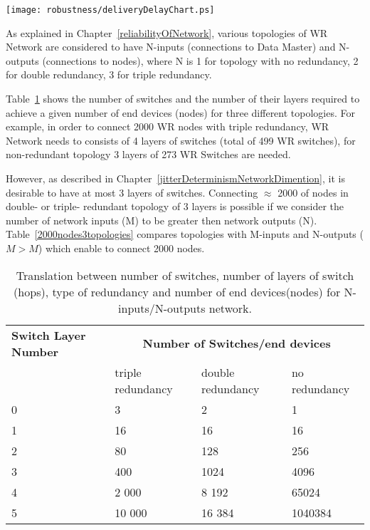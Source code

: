 \begin{center}
	\texttt{[image: robustness/deliveryDelayChart.ps]}
	\label{fig:deliveryDelayChart}
\end{center}

As explained in Chapter~\ref{reliabilityOfNetwork}, various topologies of WR
Network are considered to have N-inputs (connections to Data Master) and
N-outputs (connections to nodes), where N is 1 for topology with no redundancy,
2 for double redundancy, 3 for triple redundancy. 

Table~\ref{tab:translation3topologies} shows the number of switches and the
number of their layers required to achieve a given number of end devices (nodes)
for three different topologies.
For example, in order to connect 2000 WR nodes with triple redundancy, WR
Network needs to consists of 4 layers of switches (total of 499 WR switches),
for non-redundant topology 3 layers of 273 WR Switches are needed. 

However, as described in Chapter~\ref{jitterDeterminismNetworkDimention}, it is
desirable to have at most 3 layers of switches. Connecting $\approx$ 2000 of
nodes in double- or triple- redundant topology of 3 layers is possible if we
consider the number of network inputs (M) to be greater then network outputs
(N). Table~\ref{2000nodes3topologies} compares topologies with M-inputs and
N-outputs ($M>M$) which enable to connect 2000 nodes.

\begin{table}[ht]
\caption{Translation between number of switches, number of layers of switch 
(hops), type of redundancy and number of end devices(nodes) for
N-inputs/N-outputs network.} 
\centering 
\begin{tabular}{| p{1.9cm} | p{2.7cm} | p{2.7cm} | p{2.5cm} |}       
\hline
\textbf{Switch Layer Number}& \multicolumn{3}{|c|}{\textbf{Number of
Switches/end devices}}  \\
      & triple redundancy & double redundancy & no redundancy   \\ \hline
0     & 3                 & 2                 & 1                  \\ \hline
1     & 16                & 16                & 16                \\ \hline
2     & 80                & 128               & 256               \\ \hline
3     & 400               & 1024              & 4096             \\ \hline
4     & 2 000             & 8 192             & 65024          \\ \hline
5     & 10 000            & 16 384            & 1040384        \\ \hline
\end{tabular}
\label{tab:translation3topologies}
\end{table}

